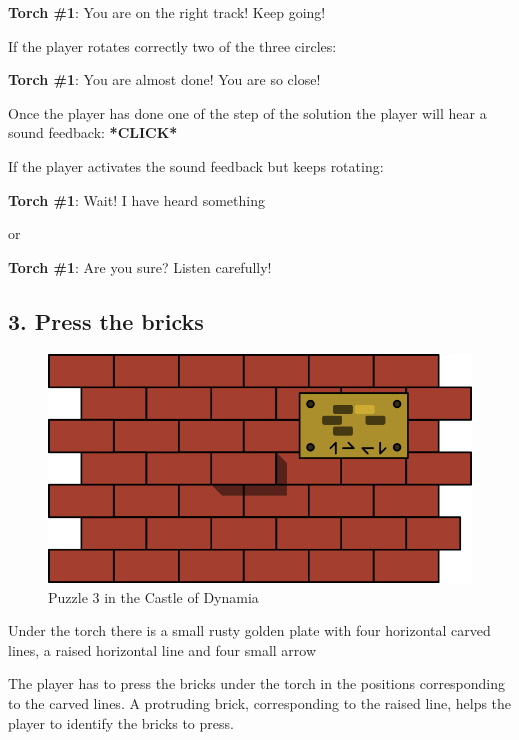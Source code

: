 \textbf{Torch \#{}1}: You are on the right track! Keep going!

If the player rotates correctly two of the three circles:

\textbf{Torch \#{}1}: You are almost done! You are so close!

Once the player has done one of the step of the solution the player will hear a sound feedback: \textbf{*CLICK*}

If the player activates the sound feedback but keeps rotating:

\textbf{Torch \#{}1}: Wait! I have heard something

or

\textbf{Torch \#{}1}: Are you sure? Listen carefully!


\subsection{3. Press the bricks}

\begin{figure}[H]
  \centering
  \includegraphics[width=\textwidth]{Images/Puzzles/castleOfDynamia3}
  \caption{Puzzle 3 in the Castle of Dynamia}
\end{figure}



Under the torch there is a small rusty golden plate with four horizontal carved lines, a raised horizontal line and four small arrow

The player has to press the bricks under the torch in the positions corresponding to the carved lines. A protruding brick, corresponding to the raised line, helps the player to identify the bricks to press.

